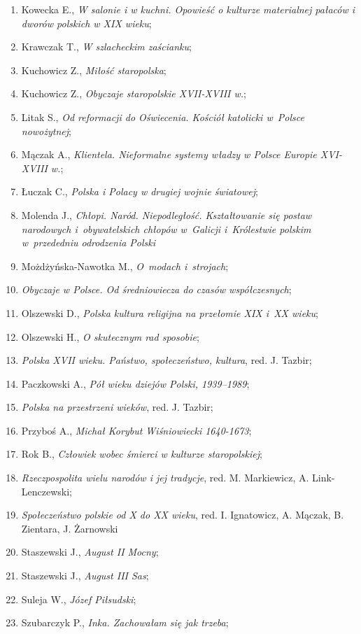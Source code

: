\documentclass[a4paper,11pt]{article}
\begin{document}
\begin{enumerate}
\item Kowecka E., \emph{W salonie i w kuchni. Opowieść o kulturze
    materialnej pałaców i dworów polskich w XIX wieku};
\item Krawczak T., \emph{W szlacheckim zaścianku};
\item Kuchowicz Z., \emph{Miłość staropolska};
\item Kuchowicz Z., \emph{Obyczaje staropolskie XVII-XVIII w.};
\item Litak S., \emph{Od reformacji do Oświecenia. Kościół katolicki
    w~Polsce nowożytnej};
\item Mączak A., \emph{Klientela. Nieformalne systemy władzy w Polsce
    Europie XVI-XVIII w.};
\item Łuczak C., \emph{Polska i Polacy w drugiej wojnie światowej};
\item Molenda J., \emph{Chłopi. Naród. Niepodległość. Kształtowanie
    się postaw narodowych i~obywatelskich chłopów w~Galicji
    i~Królestwie polskim w~przededniu odrodzenia Polski}
\item Możdżyńska-Nawotka M., \emph{O~modach i~strojach};
\item \emph{Obyczaje w Polsce. Od średniowiecza do czasów
    współczesnych};
\item Olszewski D., \emph{Polska kultura religijna na przełomie XIX
    i~XX wieku};
\item Olszewski H., \emph{O skutecznym rad sposobie};
\item \emph{Polska XVII wieku. Państwo, społeczeństwo, kultura}, red.
  J. Tazbir;
\item Paczkowski A., \emph{Pół wieku dziejów Polski, 1939--1989};
\item \emph{Polska na przestrzeni wieków}, red. J. Tazbir;
\item Przyboś A., \emph{Michał Korybut Wiśniowiecki 1640-1673};
\item Rok B., \emph{Człowiek wobec śmierci w kulturze staropolskiej};
\item \emph{Rzeczpospolita wielu narodów i jej tradycje}, red. M.
  Markiewicz, A. Link-Lenczewski;
\item \emph{Społeczeństwo polskie od X do XX wieku}, red. I.
  Ignatowicz, A. Mączak, B. Zientara, J. Żarnowski
\item Staszewski J., \emph{August II Mocny};
\item Staszewski J., \emph{August III Sas};
\item Suleja W., \emph{Józef Piłsudski};
\item Szubarczyk P., \emph{Inka. Zachowałam się jak trzeba\ld};

\end{enumerate}
\end{document}
